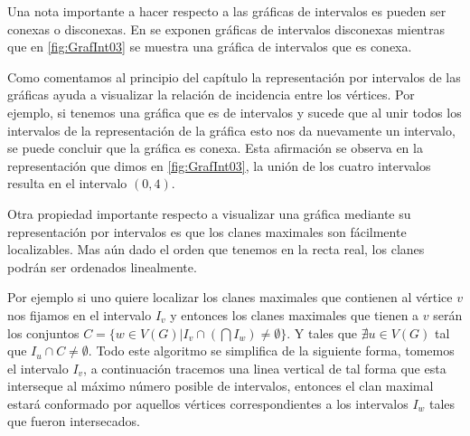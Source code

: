Una nota importante a hacer respecto a las gráficas de intervalos es pueden ser conexas o disconexas. En  se exponen gráficas de intervalos disconexas mientras que en \cref{fig:GrafInt03} se muestra una gráfica de intervalos que es conexa. 

Como comentamos al principio del capítulo la representación por intervalos de las gráficas ayuda a visualizar la relación de incidencia entre los vértices. Por ejemplo, si tenemos una gráfica que es de intervalos y sucede que al unir todos los intervalos de la representación de la gráfica esto nos da nuevamente un intervalo, se puede concluir que la gráfica es conexa.
Esta afirmación se observa en la representación que dimos en \cref{fig:GrafInt03}, la unión de los cuatro intervalos resulta en el intervalo $(0,4)$.

Otra propiedad importante respecto a visualizar una gráfica mediante su representación por intervalos es que los clanes maximales son fácilmente localizables. Mas aún dado el orden que tenemos en la recta real, los clanes podrán ser ordenados linealmente.

Por ejemplo si uno quiere localizar los clanes maximales que contienen al vértice $v$ nos fijamos en el intervalo $I_v$ y entonces los clanes maximales que tienen a $v$ serán los conjuntos $C = \{w \in V(G)| I_v \cap (\bigcap I_w) \neq \emptyset\}$.
Y tales que $\nexists u \in V(G)$ tal que $I_u \cap C \neq \emptyset$.
Todo este algoritmo se simplifica de la siguiente forma, tomemos el intervalo $I_v$, a continuación tracemos una linea vertical de tal forma que esta interseque al máximo número posible de intervalos, entonces el clan maximal estará conformado por aquellos vértices correspondientes a los intervalos $I_w$ tales que fueron intersecados.  

